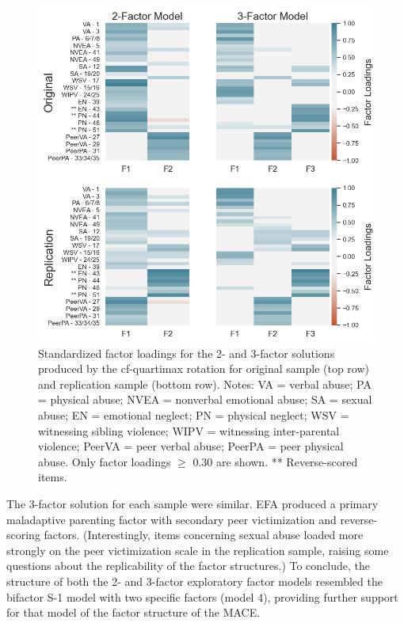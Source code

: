 \documentclass[letterpaper,man,natbib,noextraspace,floatsintext,longtable]{apa6}
\begin{document}
\begin{figure}[t!]
    \centering
    \includegraphics[width=1\textwidth,center]{figures/fig04.png}
    \caption{\normalfont Standardized factor loadings for the 2- and 3-factor solutions produced by the cf-quartimax rotation for original sample (top row) and replication sample (bottom row). \break \small Notes: VA = verbal abuse; PA = physical abuse; NVEA = nonverbal emotional abuse; SA = sexual abuse; EN = emotional neglect; PN = physical neglect; WSV = witnessing sibling violence; WIPV = witnessing inter-parental violence; PeerVA = peer verbal abuse; PeerPA = peer physical abuse. Only factor loadings $\geq$ 0.30 are shown. ** Reverse-scored items.}
    \label{fig:efa_cf}
\end{figure}

The 3-factor solution for each sample were similar. EFA produced a primary maladaptive parenting factor with secondary peer victimization and reverse-scoring factors. (Interestingly, items concerning sexual abuse loaded more strongly on the peer victimization scale in the replication sample, raising some questions about the replicability of the factor structures.) To conclude, the structure of both the 2- and 3-factor exploratory factor models resembled the bifactor S-1 model with two specific factors (model 4), providing further support for that model of the factor structure of the MACE. 
\end{document}
